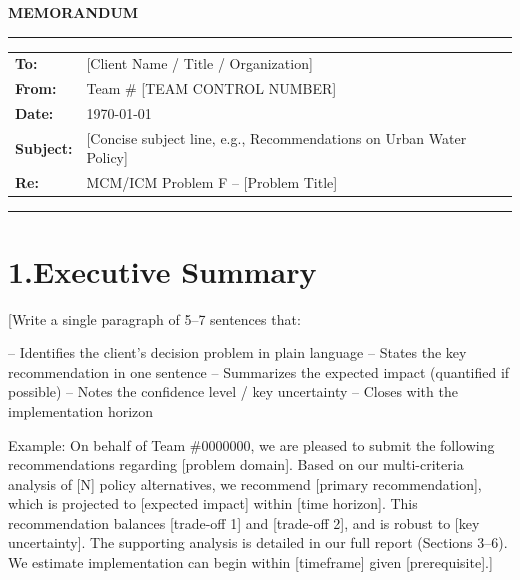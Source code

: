 \documentclass[12pt, a4paper]{article}
\begin{document}
\thispagestyle{empty}

\begin{center}
{\Large\textbf{MEMORANDUM}} \\[0.3cm]
\rule{\textwidth}{0.5pt}
\end{center}

\vspace{0.5cm}

\begin{tabular}{@{}ll}
\textbf{To:} & [Client Name / Title / Organization] \\
\textbf{From:} & Team \# [TEAM CONTROL NUMBER] \\
\textbf{Date:} & \today \\
\textbf{Subject:} & [Concise subject line, e.g., Recommendations on Urban Water Policy] \\
\textbf{Re:} & MCM/ICM Problem F -- [Problem Title] \\
\end{tabular}

\vspace{0.5cm}
\rule{\textwidth}{0.5pt}
\vspace{0.5cm}

\section*{1.\quad Executive Summary}

[Write a single paragraph of 5--7 sentences that:

  -- Identifies the client's decision problem in plain language
  -- States the key recommendation in one sentence
  -- Summarizes the expected impact (quantified if possible)
  -- Notes the confidence level / key uncertainty
  -- Closes with the implementation horizon

Example: On behalf of Team \#0000000, we are pleased to submit the
following recommendations regarding [problem domain]. Based on our
multi-criteria analysis of [N] policy alternatives, we recommend
[primary recommendation], which is projected to [expected impact]
within [time horizon]. This recommendation balances [trade-off 1]
and [trade-off 2], and is robust to [key uncertainty]. The
supporting analysis is detailed in our full report (Sections 3--6).
We estimate implementation can begin within [timeframe] given
[prerequisite].]
\end{document}
